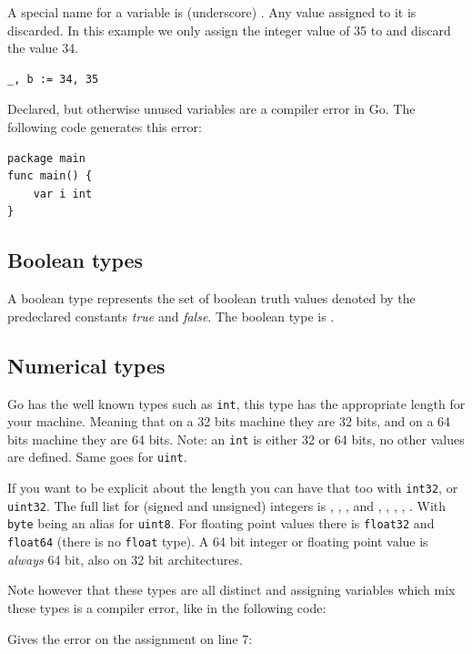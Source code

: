 A special name for a variable is \var{\textbf{\_}} 
(underscore) . Any value
assigned to it is discarded. In this example we only assign the integer
value of 35 to  and discard the value 34.
\begin{lstlisting}
_, b := 34, 35
\end{lstlisting}
Declared, but otherwise unused variables are a compiler error in Go. The
following code generates this error:

\begin{lstlisting}
package main
func main() { 
    var i int
}
\end{lstlisting}

\subsection{Boolean types}
A boolean type represents the set of boolean truth values denoted by the
predeclared constants \emph{true} and \emph{false}. The boolean type is .

\subsection{Numerical types}
Go has the well known types such as \lstinline{int}, this type
has the appropriate length for your machine. 
Meaning that on a 32 bits machine they are 32 bits, and on
a 64 bits machine they are 64 bits. Note: an \lstinline{int} is
either 32 or 64 bits, no other values are defined. Same goes 
for \lstinline{uint}.

If you want to be explicit about the length you can have
that too with \lstinline{int32}, or \lstinline{uint32}. The full
list for (signed and unsigned) integers is
, , ,  and
, , , , .
With \lstinline{byte} being an
alias for \lstinline{uint8}. For floating point values there is
\lstinline{float32} and \lstinline{float64} (there is no \lstinline{float} type). 
A 64 bit integer or floating point value is \emph{always} 64 bit, also on 32 bit
architectures.

Note however
that these types are all distinct and assigning variables which mix
these types is a compiler error, like in the following code:

Gives the error on the assignment on line 7:

